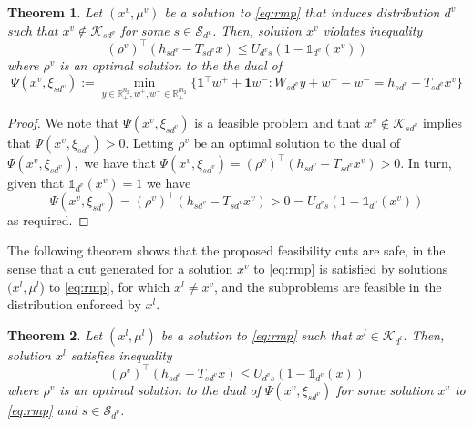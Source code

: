 \documentclass[12pt]{article}
\newtheorem{theorem}{Theorem}%
\theoremstyle{thmstylethree}%
\newcommand{\mtc}[1] {\mathcal{#1}}
\def\R{\ensuremath{\mathbb{R}}}
\def\Ind{\ensuremath{\mathbb{1}}}
\begin{document}
\begin{theorem}\label{prop:fc:continuous}
Let $(x^v,\mu^v)$ be a solution to \eqref{eq:rmp} that induces distribution $d^v$ such that $x^v\notin\mtc{K}_{sd^v}$ for some $s\in\mtc{S}_{d^v}$.
Then, solution $x^v$ violates inequality 
\begin{equation}\label{eq:continuous:fc}
    (\rho^v)^\top(h_{sd^v}-T_{sd^v}x)\leq U_{d^vs}(1-\Ind_{d^v}(x^v))
\end{equation}
where $\rho^v$ is an optimal solution to the the dual of 
\begin{equation}\label{eq:continuous:fsp}
\Psi(x^v,\xi_{sd^v}):=\min_{y\in\R^{n_2}_+,w^+,w^-\in\R^{m_2}_+}\{\mathbf{1}^\top w^++\mathbf{1}w^-:W_{sd^v}y+w^+-w^-=h_{sd^v}-T_{sd^v}x^v\}
\end{equation}
\end{theorem}
\begin{proof}
We note that $\Psi(x^v,\xi_{sd^v})$  is a feasible problem and that $x^v\notin\mtc{K}_{sd^v}$ implies that $\Psi(x^v,\xi_{sd^v})  >0.$
Letting $\rho^v$ be an optimal solution to the dual of $\Psi(x^v,\xi_{sd^v}),$ we have that $\Psi(x^v,\xi_{sd^v})= (\rho^v)^\top(h_{sd^v}-T_{sd^v}x^v)>0.$
In turn, given that $\Ind_{d^v}(x^v)=1$ we have
$$\Psi(x^v,\xi_{sd^v})= (\rho^v)^\top(h_{sd^v}-T_{sd^v}x^v)> 0 = U_{d^vs}(1-\Ind_{d^v}(x^v))$$
as required.
\end{proof}


The following theorem shows that the proposed feasibility cuts are safe, in the sense that a cut generated for a solution $x^v$ to \eqref{eq:rmp} is satisfied by solutions $(x^l,\mu^l$) to \eqref{eq:rmp}, for which $x^l \neq x^v$, and the subproblems are feasible in the distribution enforced by $x^l$. 
\begin{theorem}\label{prop:fc:continuous:safe}
Let $(x^l,\mu^l)$ be a solution to \eqref{eq:rmp} such that $x^l\in\mtc{K}_{d^l}$.
Then, solution $x^l$ satisfies inequality
\begin{equation*}
    (\rho^v)^\top(h_{sd^v}-T_{sd^v}x)\leq U_{d^vs}(1-\Ind_{d^v}(x))
\end{equation*}
where $\rho^v$ is an optimal solution to the dual of $\Psi(x^v,\xi_{sd^v})$ for some solution $x^v$ to \eqref{eq:rmp} and $s\in\mtc{S}_{d^v}$.
\end{theorem}
\end{document}
